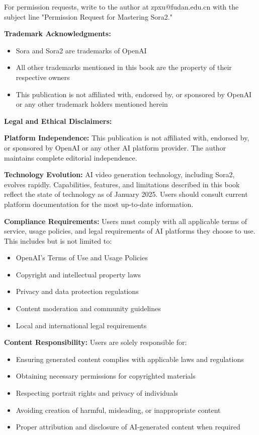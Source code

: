 \documentclass[11pt,letterpaper]{book}
\begin{document}
For permission requests, write to the author at zpxu@fudan.edu.cn with the subject line "Permission Request for Mastering Sora2."

\textbf{Trademark Acknowledgments:}
\begin{itemize}
\item Sora and Sora2 are trademarks of OpenAI
\item All other trademarks mentioned in this book are the property of their respective owners
\item This publication is not affiliated with, endorsed by, or sponsored by OpenAI or any other trademark holders mentioned herein
\end{itemize}

\vspace{0.5cm}

\textbf{Legal and Ethical Disclaimers:}

\textbf{Platform Independence:} This publication is not affiliated with, endorsed by, or sponsored by OpenAI or any other AI platform provider. The author maintains complete editorial independence.

\textbf{Technology Evolution:} AI video generation technology, including Sora2, evolves rapidly. Capabilities, features, and limitations described in this book reflect the state of technology as of January 2025. Users should consult current platform documentation for the most up-to-date information.

\textbf{Compliance Requirements:} Users must comply with all applicable terms of service, usage policies, and legal requirements of AI platforms they choose to use. This includes but is not limited to:
\begin{itemize}
\item OpenAI's Terms of Use and Usage Policies
\item Copyright and intellectual property laws
\item Privacy and data protection regulations
\item Content moderation and community guidelines
\item Local and international legal requirements
\end{itemize}

\textbf{Content Responsibility:} Users are solely responsible for:
\begin{itemize}
\item Ensuring generated content complies with applicable laws and regulations
\item Obtaining necessary permissions for copyrighted materials
\item Respecting portrait rights and privacy of individuals
\item Avoiding creation of harmful, misleading, or inappropriate content
\item Proper attribution and disclosure of AI-generated content when required
\end{itemize}
\end{document}

